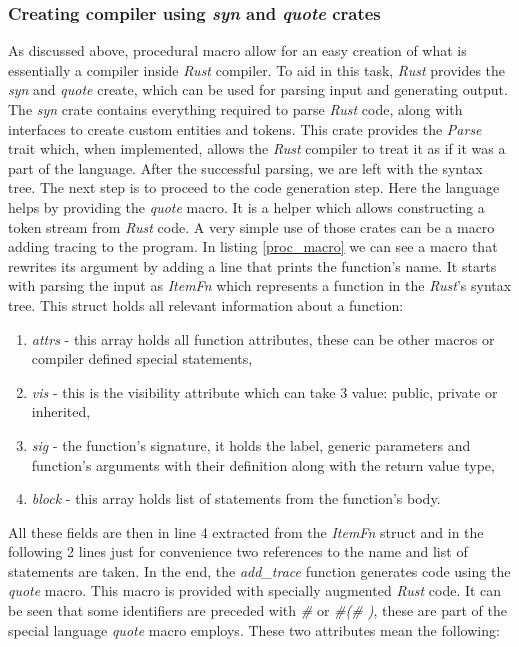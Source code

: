 \subsubsection{Creating compiler using \textit{syn} and \textit{quote} crates}
As discussed above, procedural macro allow for an easy creation of what is essentially a compiler inside \textit{Rust} compiler. To aid in this task, \textit{Rust} provides the \textit{syn} and \textit{quote} create, which can be used for parsing input and generating output. The \textit{syn} crate contains everything required to parse \textit{Rust} code, along with interfaces to create custom entities and tokens. This crate provides the \textit{Parse} trait which, when implemented, allows the \textit{Rust} compiler to treat it as if it was a part of the language. After the successful parsing, we are left with the syntax tree. The next step is to proceed to the code generation step. Here the language helps by providing the \textit{quote} macro. It is a helper which allows constructing a token stream from \textit{Rust} code. A very simple use of those crates can be a macro adding tracing to the program. In listing \ref{proc_macro} we can see a macro that rewrites its argument by adding a line that prints the function's name. It starts with parsing the input as \textit{ItemFn} which represents a function in the \textit{Rust}'s syntax tree. This struct holds all relevant information about a function:
\begin{enumerate}
    \item \textit{attrs} - this array holds all function attributes, these can be other macros or compiler defined special statements,
    \item \textit{vis} - this is the visibility attribute which can take 3 value: public, private or inherited,
    \item \textit{sig} - the function's signature, it holds the label, generic parameters and function's arguments with their definition along with the return value type,
    \item \textit{block} - this array holds list of statements from the function's body.
\end{enumerate}
All these fields are then in line 4 extracted from the \textit{ItemFn} struct and in the following 2 lines just for convenience two references to the name and list of statements are taken. In the end, the \textit{add\_trace} function generates code using the \textit{quote} macro. This macro is provided with specially augmented \textit{Rust} code. It can be seen that some identifiers are preceded with \textit{\#} or \textit{\#(\# )\*}, these are part of the special language \textit{quote} macro employs. These two attributes mean the following:
